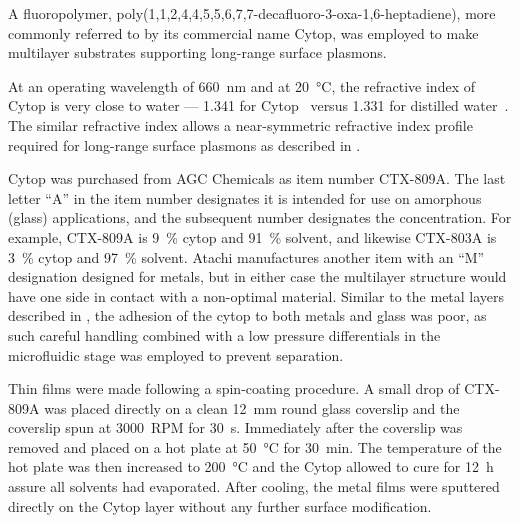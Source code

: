 A fluoropolymer, poly(1,1,2,4,4,5,5,6,7,7-decafluoro-3-oxa-1,6-heptadiene),
more commonly referred to by its commercial name Cytop, was employed to
make multilayer substrates supporting long-range surface plasmons.

At an operating wavelength of \SI{660}{\nano\meter} and at
\SI{20}{\celsius}, the refractive index of Cytop is very close to water ---
1.341 for Cytop~\cite{mikevs2005synthesis} versus 1.331 for distilled
water~\cite{andreasson1971measurement}.  The similar refractive index
allows a near-symmetric refractive index profile required for long-range
surface plasmons as described in .

Cytop was purchased from AGC Chemicals as item number CTX-809A.  The last
letter ``A'' in the item number designates it is intended for use on amorphous
(glass) applications, and the subsequent number designates the concentration.
For example, CTX-809A is \SI{9}{\percent} cytop and \SI{91}{\percent} solvent,
and likewise CTX-803A is \SI{3}{\percent} cytop and \SI{97}{\percent} solvent.
Atachi manufactures another item with an ``M'' designation designed for
metals, but in either case the multilayer structure would have one side in
contact with a non-optimal material.  Similar to the metal layers described in
, the adhesion of the cytop to both metals and
glass was poor, as such careful handling combined with a low pressure
differentials in the microfluidic stage was employed to prevent separation.

Thin films were made following a spin-coating procedure.  A small drop of
CTX-809A was placed directly on a clean \SI{12}{\milli\meter} round glass
coverslip and the coverslip spun at \SI{3000}{RPM} for \SI{30}{\second}.
Immediately after the coverslip was removed and placed on a hot plate at
\SI{50}{\celsius} for \SI{30}{\minute}.  The temperature of the hot plate was
then increased to \SI{200}{\celsius} and the Cytop allowed to cure for
\SI{12}{\hour} assure all solvents had evaporated.  After cooling, the metal
films were sputtered directly on the Cytop layer without any further surface
modification.


